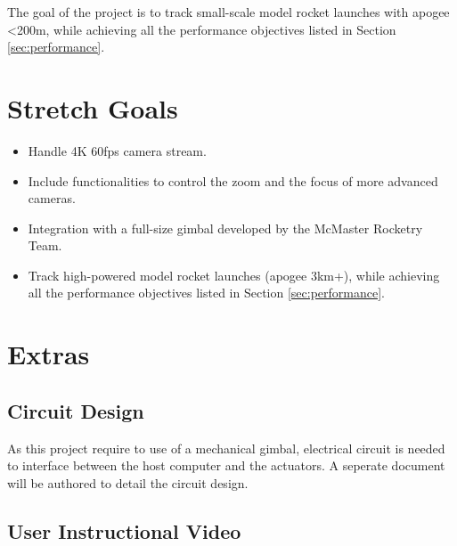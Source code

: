 \documentclass{article}
\begin{document}
The goal of the project is to track small-scale model rocket launches with
apogee \textless 200m, while achieving all the performance objectives listed in
Section \ref{sec:performance}.

\section{Stretch Goals}

\begin{itemize}
    \item Handle 4K 60fps camera stream.
    \item Include functionalities to control the zoom and the focus of more advanced
          cameras.
    \item Integration with a full-size gimbal developed by the McMaster Rocketry Team.
    \item Track high-powered model rocket launches (apogee 3km+), while achieving all the
          performance objectives listed in Section \ref{sec:performance}.
\end{itemize}

\section{Extras}


\subsection{Circuit Design}

As this project require to use of a mechanical gimbal, electrical circuit is
needed to interface between the host computer and the actuators. A seperate
document will be authored to detail the circuit design.

\subsection{User Instructional Video}
\end{document}
